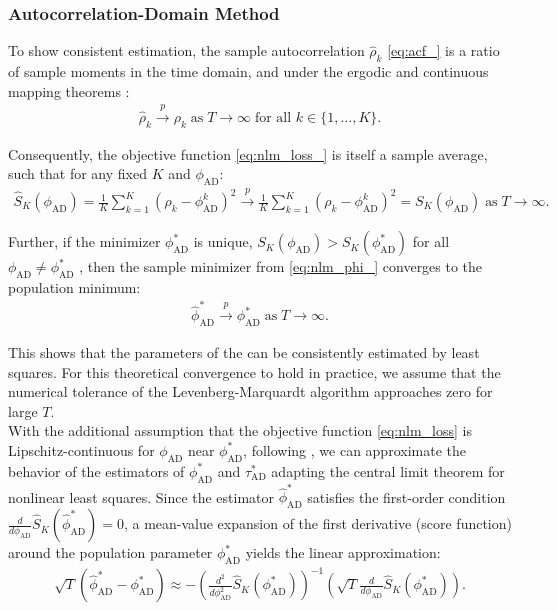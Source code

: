 \documentclass[9pt]{article}
\newcommand{\phiad}{\phi_{\scriptscriptstyle\text{AD}}}
\newcommand{\hatphiad}{\hat{\phi}^*_{\scriptscriptstyle\text{AD}}}
\newcommand{\tauad}{\tau_{\scriptscriptstyle\text{AD}}}
\begin{document}
\subsubsection{Autocorrelation-Domain Method}

To show consistent estimation, the sample autocorrelation $\hat\rho_k$ \eqref{eq:acf_} is a ratio of sample moments in the time domain, and under the ergodic and continuous mapping theorems \citep[Theorem~14.9]{hansen_econometrics_2022}:
\begin{align}
    \hat\rho_k \overset{p}{\to} \rho_k \;\text{as}\;T\to\infty\;\text{for all }k\in\{1, \dots, K\}.
\end{align}

\noindent Consequently, the objective function \eqref{eq:nlm_loss_} is itself a sample average, such that for any fixed $K$ and $\phiad$:
\begin{align}
    \widehat{S}_K(\phiad) = \frac{1}{K}\sum_{k=1}^K (\hat\rho_k - \phiad^k)^2 \overset{p}{\to} \frac{1}{K}\sum_{k=1}^K (\rho_k - \phiad^k)^2 = S_K(\phiad) \;\text{as}\;T\to\infty.
\end{align}

\noindent Further, if the minimizer $\phiad^*$ is unique, $S_K(\phiad)>S_K(\phiad^*)$ for all $\phiad\ne\phiad^*$ \citep[Theorem~22.1]{hansen_econometrics_2022}, then the sample minimizer from \eqref{eq:nlm_phi_} converges to the population minimum:
\begin{align}
    \hatphiad \overset{p}{\to} \phiad^* \;\text{as}\;T\to\infty.
\end{align}

\noindent This shows that the parameters of the  can be consistently estimated by least squares. For this theoretical convergence to hold in practice, we assume that the numerical tolerance of the Levenberg-Marquardt algorithm approaches zero for large $T$.\\

With the additional assumption that the objective function \eqref{eq:nlm_loss} is Lipschitz-continuous for $\phiad$ near $\phiad^*$, following \citet[Theorem~23.2]{hansen_econometrics_2022}, we can approximate the behavior of the estimators of $\phiad^*$ and $\tauad^*$ adapting the central limit theorem for nonlinear least squares. Since the estimator $\hatphiad$ satisfies the first-order condition $\frac{d}{d\phiad}\widehat{S}_K(\hatphiad) = 0$, a mean-value expansion of the first derivative (score function) around the population parameter $\phiad^*$ yields the linear approximation:
\begin{align}
    \sqrt{T} (\hatphiad - \phiad^*) \approx -\left(\frac{d^2}{d\phiad^2} \widehat{S}_K(\phiad^*)\right)^{-1} \left( \sqrt{T}\frac{d}{d\phiad} \widehat{S}_K(\phiad^*)\right).
\end{align}
\end{document}
